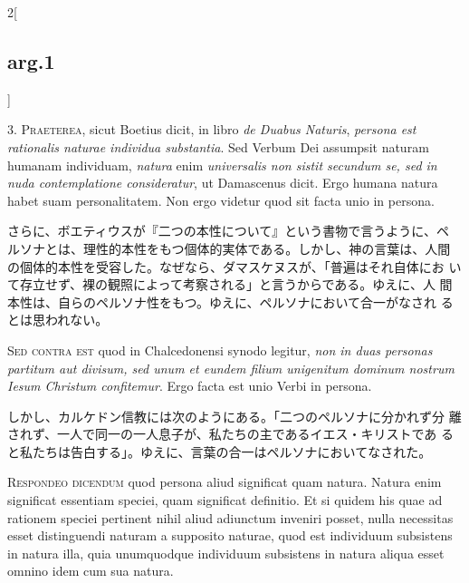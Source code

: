 \documentclass[paper=a4paper,fontsize=10pt,jafontsize=9pt,titlepage]{jlreq}
\begin{document}
\begin{paracol}{2}[\subsection{arg.1}]

3. {\scshape Praeterea}, sicut Boetius dicit, in libro {\itshape de
Duabus Naturis}, {\itshape persona est rationalis naturae individua
substantia}. Sed Verbum Dei assumpsit naturam humanam individuam,
{\itshape natura} enim {\itshape universalis non sistit secundum se,
sed in nuda contemplatione consideratur}, ut Damascenus dicit. Ergo
humana natura habet suam personalitatem. Non ergo videtur quod sit
facta unio in persona.

\switchcolumn

さらに、ボエティウスが『二つの本性について』という書物で言うように、ペ
ルソナとは、理性的本性をもつ個体的実体である。しかし、神の言葉は、人間
の個体的本性を受容した。なぜなら、ダマスケヌスが、「普遍はそれ自体にお
いて存立せず、裸の観照によって考察される」と言うからである。ゆえに、人
間本性は、自らのペルソナ性をもつ。ゆえに、ペルソナにおいて合一がなされ
るとは思われない。

\switchcolumn*[\subsection{s.c.}]

{\scshape Sed contra est} quod in Chalcedonensi synodo legitur,
{\itshape non in duas personas partitum aut divisum, sed unum et
eundem filium unigenitum dominum nostrum Iesum Christum
confitemur}. Ergo facta est unio Verbi in persona.

\switchcolumn

しかし、カルケドン信教には次のようにある。「二つのペルソナに分かれず分
離されず、一人で同一の一人息子が、私たちの主であるイエス・キリストであ
ると私たちは告白する」。ゆえに、言葉の合一はペルソナにおいてなされた。


{\scshape Respondeo dicendum} quod persona aliud significat quam
natura. Natura enim significat essentiam speciei, quam significat
definitio. Et si quidem his quae ad rationem speciei pertinent nihil
aliud adiunctum inveniri posset, nulla necessitas esset distinguendi
naturam a supposito naturae, quod est individuum subsistens in natura
illa, quia unumquodque individuum subsistens in natura aliqua esset
omnino idem cum sua natura.


\end{paracol}
\end{document}
